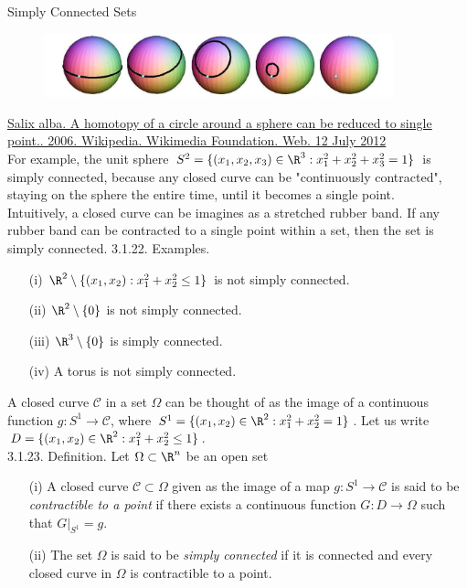 \documentclass[smaller,hyperref={CJKbookmarks=true}]{beamer}
\begin{document}
\begin{frame}{Simply Connected Sets}
\begin{spacing}{1}
\begin{figure}
  \centering
  \includegraphics[width=0.9\textwidth]{67.jpg}

\end{figure}
\vspace*{-10pt}
{\tiny{\href{http://en.wikipedia.org/wiki/File:P1S2all.jpg}{Salix alba. A homotopy of a circle around a sphere can be reduced to single point.. 2006. Wikipedia. Wikimedia Foundation. Web. 12 July 2012}}}\\[8pt]
For example, the unit sphere $S^2=\{(x_1,x_2,x_3)\in\R^3:x_1^2+x_2^2
+x_3^2=1\}$ is simply connected, because any closed curve can be "continuously
contracted", staying on the sphere the entire time, until it becomes a
single point.\\[6pt]
Intuitively, a closed curve can be imagines as a stretched rubber band. If
any rubber band can be contracted to a single point within a set, then the
set is simply connected.
\newpage
\alert{3.1.22. Examples.}\\[4pt]
\begin{itemize}
  \item[(i)] $\R^2\setminus\{(x_1,x_2):x_1^2+x_2^2\leq1\}$ is not simply connected.
  \item[(ii)] $\R^2\setminus\{0\}$ is not simply connected.
  \item[(iii)] $\R^3\setminus\{0\}$ is simply connected.
  \item[(iv)] A torus is not simply connected.
\end{itemize}
A closed curve $\mathcal{C}$ in a set $\Omega$ can be thought of as the image of a continuous function $g:S^1\to\mathcal{C}$, where $S^1=\{(x_1,x_2)\in\R^2:x_1^2+x_2^2=1\}$. Let us write $D=\{(x_1,x_2)\in\R^2:x_1^2+x_2^2\leq1\}$.\\[5pt]
\alert{3.1.23. Definition.} Let $\Omega\subset\R^n$ be an open set
\begin{itemize}
  \item[(i)] A closed curve $\mathcal{C}\subset\Omega$ given as the image of a map $g:S^1\to\mathcal{C}$ is said to be \emph{contractible to a point} if there exists a continuous function $G:D\to\Omega$ such that $G|_{S^1}=g$.
  \item[(ii)] The set $\Omega$ is said to be \emph{simply connected} if it is connected and every closed curve in $\Omega$ is contractible to a point.
\end{itemize}
\end{spacing}
\end{frame}
\end{document}
